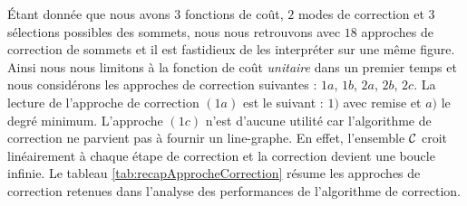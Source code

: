\'Etant donn\'ee que nous avons $3$ fonctions de co\^ut, $2$ modes de correction et $3$  s\'elections possibles des sommets, nous nous retrouvons avec $18$ approches de correction de sommets et il est fastidieux de les interpr\'eter sur une m\^eme figure.
Ainsi nous nous limitons \`a la fonction de co\^ut {\em unitaire} dans un premier temps et nous consid\'erons les approches de correction suivantes : $1a$, $1b$, $2a$, $2b$, $2c$.  
La lecture de l'approche de correction $(1a)$ est le suivant : $1)$ avec remise et $a)$ le degr\'e minimum.
L'approche $(1c)$ n'est d'aucune utilit\'e car l'algorithme de correction ne parvient pas \`a fournir un line-graphe. En effet, l'ensemble $\cal C$ croit lin\'eairement \`a chaque \'etape de correction et la correction devient une boucle infinie.
Le tableau \ref{tab:recapApprocheCorrection} r\'esume les approches de correction retenues dans l'analyse des performances de l'algorithme de correction.
